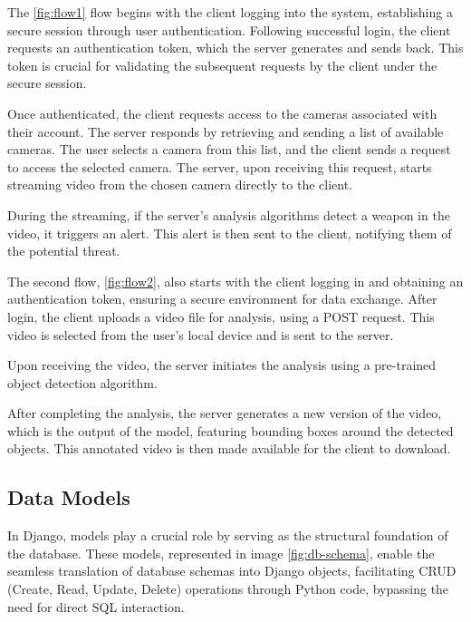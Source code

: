 The \ref{fig:flow1} flow begins with the client logging into the system, establishing a secure session 
through user authentication. Following successful login, the client requests an authentication token, which the 
server generates and sends back. This token is crucial for validating the subsequent requests by the client under 
the secure session.

Once authenticated, the client requests access to the cameras associated with their account. The server responds by 
retrieving and sending a list of available cameras. The user selects a camera from this list, and the client sends a 
request to access the selected camera. The server, upon receiving this request, starts streaming video from the chosen 
camera directly to the client.

During the streaming, if the server's analysis algorithms detect a weapon in the video, it triggers an alert. 
This alert is then sent to the client, notifying them of the potential threat.

The second flow, \ref{fig:flow2}, also starts with the client logging in and obtaining an authentication token, ensuring a 
secure environment for data exchange. After login, the client uploads a video file for analysis, using a POST 
request. This video is selected from the user's local device and is sent to the server.

Upon receiving the video, the server initiates the analysis using a pre-trained object detection algorithm. 

After completing the analysis, the server generates a new version of the video, which is the output 
of the model, featuring bounding boxes around the detected objects. This annotated video is then made 
available for the client to download.

\subsection{Data Models}

In Django, models play a crucial role by serving as the structural foundation of the database. 
These models, represented in image \ref{fig:db-schema}, enable the seamless translation of database schemas into Django objects, facilitating CRUD 
(Create, Read, Update, Delete) operations through Python code, bypassing the need for direct SQL interaction.

